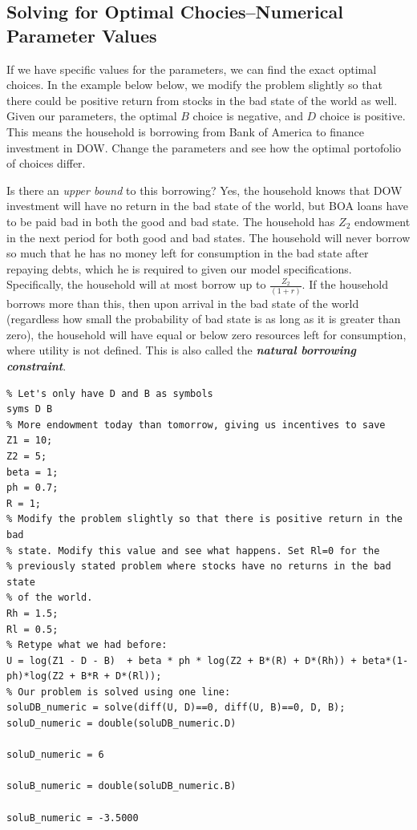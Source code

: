 \documentclass[
]{book}
\begin{document}
\hypertarget{solving-for-optimal-chociesnumerical-parameter-values}{%
\subsection{Solving for Optimal Chocies--Numerical Parameter Values}\label{solving-for-optimal-chociesnumerical-parameter-values}}

If we have specific values for the parameters, we can find the exact
optimal choices. In the example below below, we modify the problem
slightly so that there could be positive return from stocks in the bad
state of the world as well. Given our parameters, the optimal \(B\) choice
is negative, and \(D\) choice is positive. This means the household is
borrowing from Bank of America to finance investment in DOW. Change the
parameters and see how the optimal portofolio of choices differ.

Is there an \emph{upper bound} to this borrowing? Yes, the household knows
that DOW investment will have no return in the bad state of the world,
but BOA loans have to be paid bad in both the good and bad state. The
household has \(Z_2\) endowment in the next period for both good and bad
states. The household will never borrow so much that he has no money
left for consumption in the bad state after repaying debts, which he is
required to given our model specifications. Specifically, the household
will at most borrow up to \(\frac{Z_2 }{(1+r)}\). If the household borrows
more than this, then upon arrival in the bad state of the world
(regardless how small the probability of bad state is as long as it is
greater than zero), the household will have equal or below zero
resources left for consumption, where utility is not defined. This is
also called the \textbf{\emph{natural borrowing constraint}}.

\begin{verbatim}
% Let's only have D and B as symbols
syms D B 
% More endowment today than tomorrow, giving us incentives to save
Z1 = 10;
Z2 = 5;
beta = 1;
ph = 0.7;
R = 1;
% Modify the problem slightly so that there is positive return in the bad
% state. Modify this value and see what happens. Set Rl=0 for the
% previously stated problem where stocks have no returns in the bad state
% of the world.
Rh = 1.5;
Rl = 0.5;
% Retype what we had before:
U = log(Z1 - D - B)  + beta * ph * log(Z2 + B*(R) + D*(Rh)) + beta*(1-ph)*log(Z2 + B*R + D*(Rl));
% Our problem is solved using one line:
soluDB_numeric = solve(diff(U, D)==0, diff(U, B)==0, D, B);
soluD_numeric = double(soluDB_numeric.D)

soluD_numeric = 6

soluB_numeric = double(soluDB_numeric.B)

soluB_numeric = -3.5000
\end{verbatim}
\end{document}
